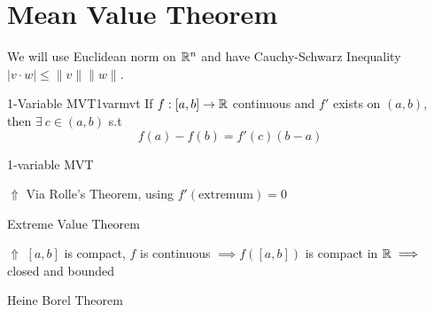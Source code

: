 \chapter{Mean Value Theorem}
We will use Euclidean norm on $\mathbb{R}^n$ and have Cauchy-Schwarz Inequality $|v\cdot w|\leq \|v\|\|w\|$.
\begin{theorem}{1-Variable MVT}{1varmvt}
	If $f:[a,b]\to \mathbb{R}$ continuous and $f'$ exists on $(a,b)$, then $\exists\ c\in(a,b)$ s.t $$f(a)-f(b)=f'(c)(b-a)$$
\end{theorem}
\begin{myproof}1-variable MVT

	\hspace{1cm} $\Uparrow$ Via Rolle's Theorem, using $f'(\text{extremum})=0$

	\hspace*{0.5cm}Extreme Value Theorem

	\hspace{1cm} $\Uparrow$ $[a,b]$ is compact, $f$ is continuous $\implies f([a,b])$ is compact in $\mathbb{R}\implies $ closed and bounded

	\hspace*{0.5cm}Heine Borel Theorem
\end{myproof}

